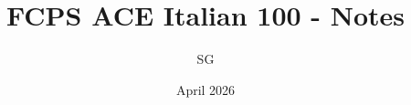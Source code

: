    \title{FCPS ACE Italian 100 - Notes}
    \author{SG}
    \date{April 2026}
    \maketitle
    \tableofcontents
    
